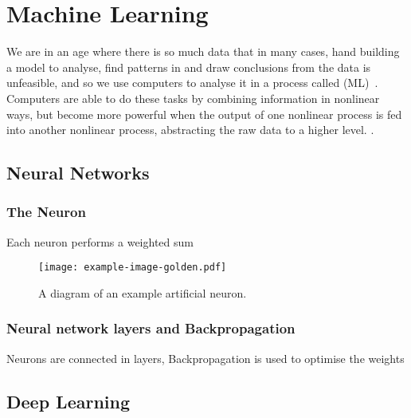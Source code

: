 
\chapter{Machine Learning}

We are in an age where there is so much data that in many cases, hand building a model to analyse, find patterns in and draw conclusions from the data is unfeasible, and so we use computers to analyse it in a process called  (ML)~\autocite[1]{murphy2012}.
Computers are able to do these tasks by combining information in nonlinear ways, but become more powerful when the output of one nonlinear process is fed into another nonlinear process, abstracting the raw data to a higher level.
.

\section{Neural Networks}

\subsection{The Neuron}

\begin{todo}
	Each neuron performs a weighted sum 
\end{todo}

\begin{figure}[htbp]
	\centering
	\texttt{[image: example-image-golden.pdf]}
	\caption{A diagram of an example artificial neuron.}
	\label{fig:neuron-example}
\end{figure}

\subsection{Neural network layers and Backpropagation}

\begin{todo}
	Neurons are connected in layers, Backpropagation is used to optimise the weights
\end{todo}

\section{Deep Learning}

